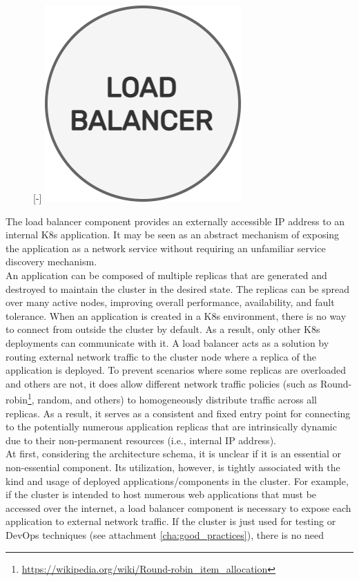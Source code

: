 \begin{figure} %
  \raisebox{0pt}[\dimexpr\height-\baselineskip\relax]{\centering
  \includegraphics[width=.2\textwidth]{images/recluster/load_balancer.png}}
\end{figure}

The load balancer component provides an externally accessible IP address to an
internal K8s application. It may be seen as an abstract mechanism of exposing the
application as a network service without requiring an unfamiliar service discovery
mechanism\cite{load_balancer}. \\ %
An application can be composed of multiple replicas that are generated and
destroyed to maintain the cluster in the desired state. The replicas can be spread
over many active nodes, improving overall performance, availability, and fault
tolerance. When an application is created in a K8s environment, there is no way
to connect from outside the cluster by default. As a result, only other K8s
deployments can communicate with it. A load balancer acts as a solution by routing
external network traffic to the cluster node where a replica of the application is
deployed. To prevent scenarios where some replicas are overloaded and others are
not, it does allow different network traffic policies (such as Round-robin\footnote{\url{https://wikipedia.org/wiki/Round-robin_item_allocation}},
random, and others) to homogeneously distribute traffic across all replicas. As
a result, it serves as a consistent and fixed entry point for connecting to the potentially
numerous application replicas that are intrinsically dynamic due to their non-permanent
resources (i.e., internal IP address). \\ %
At first, considering the architecture schema, it is unclear if it is an essential
or non-essential component. Its utilization, however, is tightly associated with
the kind and usage of deployed applications/components in the cluster. For example,
if the cluster is intended to host numerous web applications that must be
accessed over the internet, a load balancer component is necessary to expose each
application to external network traffic. If the cluster is just used for testing
or DevOps techniques (see attachment \ref{cha:good_practices}), there is no need
